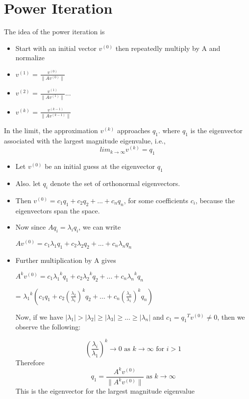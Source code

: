 \section{Power Iteration}
\label{Section Power Iteration}
The idea of the power iteration is 
    \begin{itemize}
    \label{Power Iteration}
        \item Start with an initial vector $v^{(0)}$ then repeatedly multiply by A and normalize
        \item $v^{(1)}$ = $\frac{v^{(0)}}{\|Av^{(0)}\|}$
        \item $v^{(2)}$ = $\frac{v^{(1)}}{\|Av^{(1)}\|}$...
        \item $v^{(k)}$ = $\frac{v^{(k-1)}}{\|Av^{(k-1)}\|}$
    \end{itemize}
In the limit, the approximation $v^{(k)}$ approaches $q_1$. where $q_1$ is the eigenvector associated with the largest magnitude eigenvalue, i.e., 
    \begin{equation}
        lim_{k \rightarrow \infty} v^{(k)} = q_1
    \end{equation}

    \begin{itemize}
        \item Let $v^{(0)}$ be an initial guess at the eigenvector $q_1$
        \item Also. let ${q_i}$ denote the set of orthonormal eigenvectors.
        \item Then $v^{(0)} = c_1q_1 + c_2q_2 + ... + c_nq_n$, for some coefficients $c_i$, because the eigenvectors span the space.
        \item Now since $Aq_i = \lambda_iq_i$, we can write
        
        $Av^{(0)} = c_1\lambda_1q_1 + c_2\lambda_2q_2 + ... + c_n\lambda_nq_n  $
        \item Further multiplication by A gives

        $A^kv^{(0)} = c_1{\lambda_1}^kq_1 + c_2{\lambda_2}^kq_2 + ... + c_n{\lambda_n}^kq_n $

                    = ${\lambda_1}^k (c_1q_1 + c_2{(\frac{\lambda_2}{\lambda_1})}^kq_2 + ... +c_n{(\frac{\lambda_n}{\lambda_1})}^kq_n)  $

        Now, if we have $|\lambda_1| > |\lambda_2| \geq |\lambda_3| \geq... \geq|\lambda_n| $ and $c_1={q_1}^T v^{(0)} \neq 0$, then we observe the following:

        \begin{equation}
            (\frac{\lambda_i}{\lambda_1})^k \rightarrow 0 \text{ as } k \rightarrow \infty \text{ for } i > 1
        \end{equation}
    Therefore
        \begin{equation}
            q_1 = \frac{A^kv^{(0)}}{\|A^kv^{(0)}\|} \text{ as } k \rightarrow \infty
        \end{equation}
        This is the eigenvector for the largest magnitude eigenvalue
    \end{itemize}

